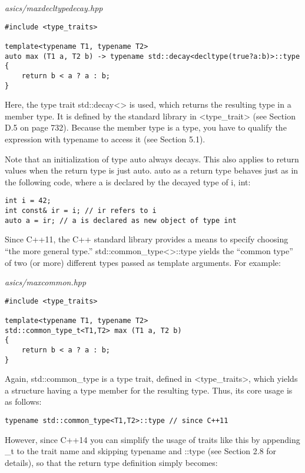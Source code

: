\noindent
\textit{asics/maxdecltypedecay.hpp}
\begin{lstlisting}[style=styleCXX]
#include <type_traits>

template<typename T1, typename T2>
auto max (T1 a, T2 b) -> typename std::decay<decltype(true?a:b)>::type
{
	return b < a ? a : b;
}
\end{lstlisting}

Here, the type trait std::decay<> is used, which returns the resulting type in a member type. It is defined by the standard library in <type\_trait> (see Section D.5 on page 732). Because the member type is a type, you have to qualify the expression with typename to access it (see Section 5.1).

Note that an initialization of type auto always decays. This also applies to return values when the return type is just auto. auto as a return type behaves just as in the following code, where a is declared by the decayed type of i, int:

\begin{lstlisting}[style=styleCXX]
int i = 42;
int const& ir = i; // ir refers to i
auto a = ir; // a is declared as new object of type int
\end{lstlisting}


Since C++11, the C++ standard library provides a means to specify choosing “the more general type.” std::common\_type<>::type yields the “common type” of two (or more) different types passed as template arguments. For example:

\noindent
\textit{asics/maxcommon.hpp}
\begin{lstlisting}[style=styleCXX]
#include <type_traits>

template<typename T1, typename T2>
std::common_type_t<T1,T2> max (T1 a, T2 b)
{
	return b < a ? a : b;
}
\end{lstlisting}

Again, std::common\_type is a type trait, defined in <type\_traits>, which yields a structure having a type member for the resulting type. Thus, its core usage is as follows:

\begin{lstlisting}[style=styleCXX]
typename std::common_type<T1,T2>::type // since C++11
\end{lstlisting}

However, since C++14 you can simplify the usage of traits like this by appending \_t to the trait name and skipping typename and ::type (see Section 2.8 for details), so that the return type definition simply becomes:

